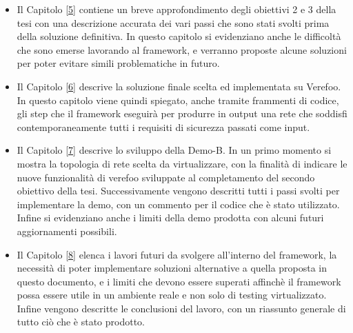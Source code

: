 \begin{itemize}
    \item Il Capitolo \hyperref[ch:intro]{[5]} contiene un breve approfondimento degli obiettivi 2 e 3 della tesi con una descrizione accurata dei vari passi che sono stati svolti prima della soluzione definitiva.
          In questo capitolo si evidenziano anche le difficoltà che sono emerse lavorando al framework, e verranno proposte alcune soluzioni per poter evitare simili problematiche in futuro.
    \item Il Capitolo \hyperref[ch:intro]{[6]} descrive la soluzione finale scelta ed implementata su Verefoo. In questo capitolo viene quindi spiegato, anche tramite frammenti di codice, gli step
          che il framework eseguirà per produrre in output una rete che soddisfi contemporaneamente tutti i requisiti di sicurezza passati come input. 
    \item Il Capitolo \hyperref[ch:intro]{[7]} descrive lo sviluppo della Demo-B. In un primo momento si mostra la topologia
        di rete scelta da virtualizzare, con la finalità di indicare le nuove funzionalità di verefoo sviluppate al completamento del secondo obiettivo della tesi. Successivamente vengono descritti tutti i passi svolti per implementare la demo, con un commento per il codice che è stato utilizzato. Infine
        si evidenziano anche i limiti della demo prodotta con alcuni  futuri aggiornamenti possibili.
    \item Il Capitolo \hyperref[ch:intro]{[8]} elenca i lavori futuri da svolgere all'interno del framework, la necessità di poter implementare soluzioni
          alternative a quella proposta in questo documento, e i limiti che devono essere superati affinchè il framework possa essere utile in un ambiente reale e non
          solo di testing virtualizzato. Infine vengono descritte le conclusioni del lavoro, con un riassunto generale di tutto ciò che è stato prodotto.
\end{itemize}